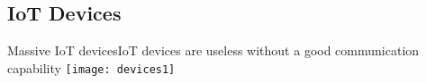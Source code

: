 





\subsection{IoT Devices}
\begin{frame}{Massive IoT devices}{IoT devices are useless without a good communication capability}
	\centering
	\texttt{[image: devices1]}
\end{frame}


